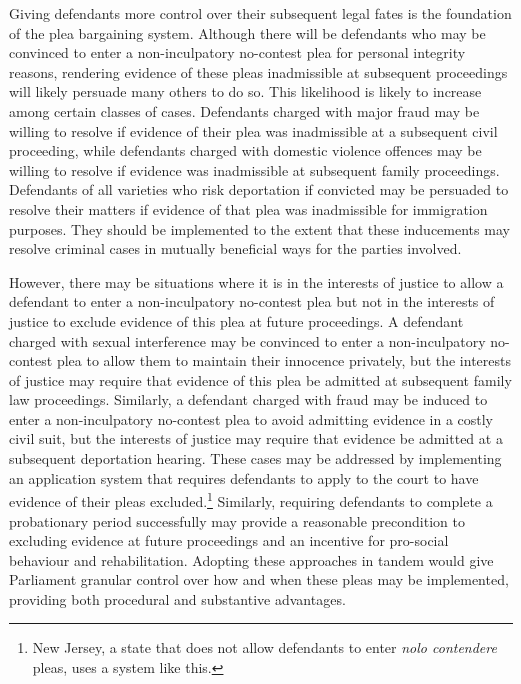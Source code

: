 Giving defendants more control over their subsequent legal fates is the foundation of the plea bargaining system. Although there will be defendants who may be convinced to enter a non-inculpatory no-contest plea for personal integrity reasons, rendering evidence of these pleas inadmissible at subsequent proceedings will likely persuade many others to do so. This likelihood is likely to increase among certain classes of cases. Defendants charged with major fraud may be willing to resolve if evidence of their plea was inadmissible at a subsequent civil proceeding, while defendants charged with domestic violence offences may be willing to resolve if evidence was inadmissible at subsequent family proceedings. Defendants of all varieties who risk deportation if convicted may be persuaded to resolve their matters if evidence of that plea was inadmissible for immigration purposes. They should be implemented to the extent that these inducements may resolve criminal cases in mutually beneficial ways for the parties involved.

However, there may be situations where it is in the interests of justice to allow a defendant to enter a non-inculpatory no-contest plea but not in the interests of justice to exclude evidence of this plea at future proceedings. A defendant charged with sexual interference may be convinced to enter a non-inculpatory no-contest plea to allow them to maintain their innocence privately, but the interests of justice may require that evidence of this plea be admitted at subsequent family law proceedings. Similarly, a defendant charged with fraud may be induced to enter a non-inculpatory no-contest plea to avoid admitting evidence in a costly civil suit, but the interests of justice may require that evidence be admitted at a subsequent deportation hearing. These cases may be addressed by implementing an application system that requires defendants to apply to the court to have evidence of their pleas excluded.\footnote{New Jersey, a state that does not allow defendants to enter \textit{nolo contendere} pleas, uses a system like this.} Similarly, requiring defendants to complete a probationary period successfully may provide a reasonable precondition to excluding evidence at future proceedings and an incentive for pro-social behaviour and rehabilitation. Adopting these approaches in tandem would give Parliament granular control over how and when these pleas may be implemented, providing both procedural and substantive advantages.